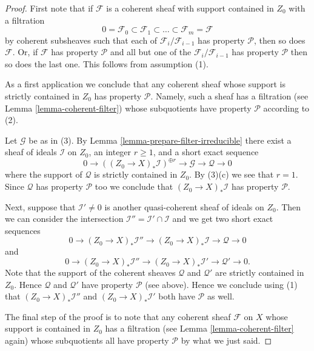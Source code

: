 \documentclass{stacks-project}
\theoremstyle{plain}
\theoremstyle{definition}
\theoremstyle{remark}
\numberwithin{equation}{subsection}
\begin{document}
\begin{proof}
First note that if $\mathcal{F}$ is a coherent sheaf with support
contained in $Z_0$ with a filtration
$$
0 = \mathcal{F}_0 \subset \mathcal{F}_1 \subset
\ldots \subset \mathcal{F}_m = \mathcal{F}
$$
by coherent subsheaves such that each of $\mathcal{F}_i/\mathcal{F}_{i - 1}$
has property $\mathcal{P}$, then so does $\mathcal{F}$. Or, if $\mathcal{F}$
has property $\mathcal{P}$ and all but one of the
$\mathcal{F}_i/\mathcal{F}_{i - 1}$ has property $\mathcal{P}$ then
so does the last one. This follows from assumption (1).

\medskip\noindent
As a first application we conclude that any coherent sheaf whose support
is strictly contained in $Z_0$ has property $\mathcal{P}$. Namely, such a
sheaf has a filtration (see Lemma \ref{lemma-coherent-filter})
whose subquotients have property $\mathcal{P}$ according to (2).

\medskip\noindent
Let $\mathcal{G}$ be as in (3). By Lemma \ref{lemma-prepare-filter-irreducible}
there exist a sheaf of ideals $\mathcal{I}$ on $Z_0$, an
integer $r \geq 1$, and a short exact sequence
$$
0 \to
\left((Z_0 \to X)_*\mathcal{I}\right)^{\oplus r} \to
\mathcal{G} \to
\mathcal{Q} \to 0
$$
where the support of $\mathcal{Q}$ is strictly contained in $Z_0$.
By (3)(c) we see that $r = 1$. Since $\mathcal{Q}$ has property $\mathcal{P}$
too we conclude that $(Z_0 \to X)_*\mathcal{I}$ has property
$\mathcal{P}$.

\medskip\noindent
Next, suppose that $\mathcal{I}' \not = 0$ is another quasi-coherent
sheaf of ideals on $Z_0$. Then we can consider the intersection
$\mathcal{I}'' = \mathcal{I}' \cap \mathcal{I}$ and we get
two short exact sequences
$$
0 \to
(Z_0 \to X)_*\mathcal{I}'' \to
(Z_0 \to X)_*\mathcal{I} \to
\mathcal{Q} \to 0
$$
and
$$
0 \to
(Z_0 \to X)_*\mathcal{I}'' \to
(Z_0 \to X)_*\mathcal{I}' \to
\mathcal{Q}' \to 0.
$$
Note that the support of the coherent sheaves $\mathcal{Q}$ and
$\mathcal{Q}'$ are strictly contained in $Z_0$.
Hence $\mathcal{Q}$ and $\mathcal{Q}'$ have property $\mathcal{P}$
(see above). Hence we conclude using (1)
that $(Z_0 \to X)_*\mathcal{I}''$ and $(Z_0 \to X)_*\mathcal{I}'$
both have $\mathcal{P}$ as well.

\medskip\noindent
The final step of the proof is to note that any coherent sheaf
$\mathcal{F}$ on $X$ whose support is contained in $Z_0$ has a filtration
(see Lemma \ref{lemma-coherent-filter} again) whose subquotients
all have property $\mathcal{P}$ by what we just said.
\end{proof}
\end{document}
